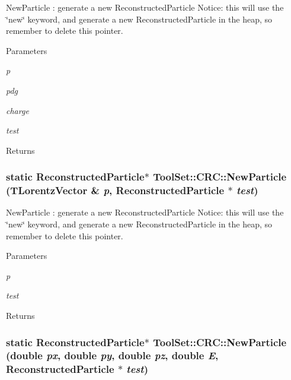 NewParticle : generate a new ReconstructedParticle Notice: this will use the \char`\"{}new\char`\"{} keyword, and generate a new ReconstructedParticle in the heap, so remember to delete this pointer. 
\begin{DoxyParams}{Parameters}
\item[{\em p}]\item[{\em pdg}]\item[{\em charge}]\item[{\em test}]\end{DoxyParams}
\begin{DoxyReturn}{Returns}

\end{DoxyReturn}
\hypertarget{classToolSet_1_1CRC_ac054a2fae3815f1d4a24c781491f03b2}{
\subsubsection[{NewParticle}]{\setlength{\rightskip}{0pt plus 5cm}static ReconstructedParticle$\ast$ ToolSet::CRC::NewParticle (TLorentzVector \& {\em p}, \/  ReconstructedParticle $\ast$ {\em test})}}
\label{classToolSet_1_1CRC_ac054a2fae3815f1d4a24c781491f03b2}


NewParticle : generate a new ReconstructedParticle Notice: this will use the \char`\"{}new\char`\"{} keyword, and generate a new ReconstructedParticle in the heap, so remember to delete this pointer. 
\begin{DoxyParams}{Parameters}
\item[{\em p}]\item[{\em test}]\end{DoxyParams}
\begin{DoxyReturn}{Returns}

\end{DoxyReturn}
\hypertarget{classToolSet_1_1CRC_a8d42a63101bab36be0173c2a4e101b7a}{
\subsubsection[{NewParticle}]{\setlength{\rightskip}{0pt plus 5cm}static ReconstructedParticle$\ast$ ToolSet::CRC::NewParticle (double {\em px}, \/  double {\em py}, \/  double {\em pz}, \/  double {\em E}, \/  ReconstructedParticle $\ast$ {\em test})}}
\label{classToolSet_1_1CRC_a8d42a63101bab36be0173c2a4e101b7a}


